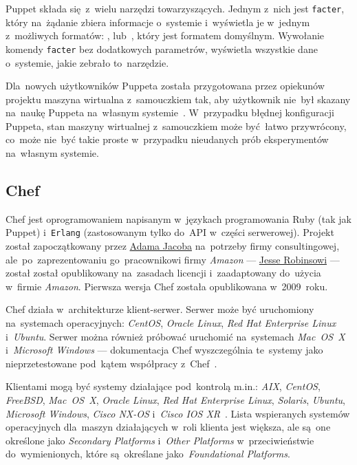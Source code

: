 \documentclass[thesis]{subfiles}
\begin{document}
Puppet składa się~z~wielu narzędzi towarzyszących. Jednym z~nich jest \texttt{facter}, który na~żądanie zbiera informacje o~systemie i~wyświetla je w~jednym z~możliwych formatów: ,  lub~, który jest formatem domyślnym. Wywołanie komendy \texttt{facter} bez dodatkowych parametrów, wyświetla wszystkie dane o~systemie, jakie zebrało to~narzędzie.

Dla~nowych użytkowników Puppeta została przygotowana przez opiekunów projektu maszyna wirtualna z~samouczkiem tak, aby użytkownik nie~był skazany na~naukę Puppeta na~własnym systemie~\cite{puppet-vm-tutorial}. W~przypadku błędnej konfiguracji Puppeta, stan maszyny wirtualnej z~samouczkiem może być~łatwo przywrócony, co~może nie~być takie proste w~przypadku nieudanych prób eksperymentów na~własnym systemie.


\subsection{Chef}

Chef jest oprogramowaniem napisanym w~językach programowania Ruby (tak jak Puppet) i~\texttt{Erlang} (zastosowanym tylko do~API w~części serwerowej). Projekt został zapoczątkowany przez \href{https://blog.chef.io/author/adam/}{Adama Jacoba} na~potrzeby firmy consultingowej, ale~po~zaprezentowaniu go~pracownikowi firmy \emph{Amazon} --- \href{https://en.wikipedia.org/wiki/Jesse_Robbins}{Jesse Robinsowi} --- został został opublikowany na~zasadach licencji  i~zaadaptowany do~użycia w~firmie \emph{Amazon}. Pierwsza wersja Chef została opublikowana w~2009~roku.

Chef działa w~architekturze klient-serwer. Serwer może być uruchomiony na~systemach operacyjnych: \emph{CentOS}, \emph{Oracle Linux}, \emph{Red Hat Enterprise Linux} i~\emph{Ubuntu}. Serwer można również próbować uruchomić na~systemach \emph{Mac~OS~X} i~\emph{Microsoft Windows} --- dokumentacja Chef wyszczególnia te~systemy jako nieprzetestowane pod~kątem współpracy z~Chef~\cite{chef-supported-platforms}.

Klientami mogą być systemy działające pod~kontrolą m.in.: \emph{AIX}, \emph{CentOS}, \emph{FreeBSD}, \emph{Mac~OS~X}, \emph{Oracle Linux}, \emph{Red Hat Enterprise Linux}, \emph{Solaris}, \emph{Ubuntu}, \emph{Microsoft Windows}, \emph{Cisco NX-OS} i~\emph{Cisco IOS XR}~\cite{chef-supported-platforms}. Lista wspieranych systemów operacyjnych dla~maszyn działających w~roli klienta jest większa, ale są~one określone jako \emph{Secondary Platforms} i~\emph{Other Platforms} w~przeciwieństwie do~wymienionych, które są~określane jako~\emph{Foundational Platforms}.
\end{document}
